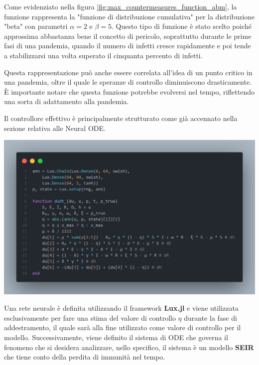 Come evidenziato nella figura \ref{fig:max_countermeasures_function_abm}, 
la funzione rappresenta la "funzione di distribuzione cumulativa" per 
la distribuzione "beta" con parametri $\alpha = 2$ e $\beta = 5$. 
Questo tipo di funzione è stato scelto poiché approssima abbastanza 
bene il concetto di pericolo, soprattutto durante le prime fasi di 
una pandemia, quando il numero di infetti cresce rapidamente e poi 
tende a stabilizzarsi una volta superato il cinquanta percento di infetti.

Questa rappresentazione può anche essere correlata all'idea di un 
punto critico in una pandemia, oltre il quale le speranze di controllo 
diminuiscono drasticamente. È importante notare che questa funzione 
potrebbe evolversi nel tempo, riflettendo una sorta di adattamento 
alla pandemia.

Il controllore effettivo è principalmente strutturato come già 
accennato nella sezione relativa alle Neural ODE.

\begin{minipage}{\linewidth}
	\centering
	\includegraphics[width=\textwidth]{img/controller1.png}
	\label{fig:controller1}
\end{minipage}

Una rete neurale è definita utilizzando il framework 
\textbf{Lux.jl} \cite{pal2023lux} e viene utilizzata esclusivamente per 
fare una stima del valore di controllo $\eta$ durante la fase di 
addestramento, il quale sarà alla fine utilizzato come valore di 
controllo per il modello. Successivamente, viene definito il sistema 
di ODE che governa il fenomeno che si desidera analizzare, 
nello specifico, il sistema è un modello \textbf{SEIR} che tiene 
conto della perdita di immunità nel tempo.

